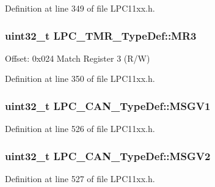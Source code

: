 Definition at line 349 of file L\+P\+C11xx.\+h.

\subsubsection[{\texorpdfstring{M\+R3}{MR3}}]{ uint32\+\_\+t L\+P\+C\+\_\+\+T\+M\+R\+\_\+\+Type\+Def\+::\+M\+R3}\hypertarget{group___l_p_c11xx___definitions_ga025ea47a7567ed8afb77463081a86f0c}{}\label{group___l_p_c11xx___definitions_ga025ea47a7567ed8afb77463081a86f0c}
Offset\+: 0x024 Match Register 3 (R/W) 

Definition at line 350 of file L\+P\+C11xx.\+h.

\subsubsection[{\texorpdfstring{M\+S\+G\+V1}{MSGV1}}]{ uint32\+\_\+t L\+P\+C\+\_\+\+C\+A\+N\+\_\+\+Type\+Def\+::\+M\+S\+G\+V1}\hypertarget{group___l_p_c11xx___definitions_ga762d98c04b8192bf57bae042e5c7bfb2}{}\label{group___l_p_c11xx___definitions_ga762d98c04b8192bf57bae042e5c7bfb2}


Definition at line 526 of file L\+P\+C11xx.\+h.

\subsubsection[{\texorpdfstring{M\+S\+G\+V2}{MSGV2}}]{ uint32\+\_\+t L\+P\+C\+\_\+\+C\+A\+N\+\_\+\+Type\+Def\+::\+M\+S\+G\+V2}\hypertarget{group___l_p_c11xx___definitions_ga2237b693c88eca2620ed971623c6db5f}{}\label{group___l_p_c11xx___definitions_ga2237b693c88eca2620ed971623c6db5f}


Definition at line 527 of file L\+P\+C11xx.\+h.

